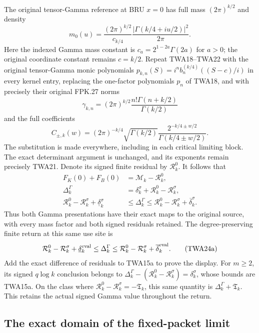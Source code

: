 The original tensor-Gamma reference at BRU $x=0$ has full mass
$(2\pi)^{k/2}$ and density
\[
m_0(u)=\frac{(2\pi)^{k/2}}{c_{k/4}}
                   \frac{|\Gamma(k/4+iu/2)|^2}{2\pi}.
\]
Here the indexed Gamma mass constant is
$c_a=2^{1-2a}\Gamma(2a)$ for $a>0$; the original coordinate
constant remains $c=k/2$.
Repeat TWA18--TWA22 with the original tensor-Gamma monic polynomials
$p_{k,n}(S)=i^n b_n^{(k/4)}((S-c)/i)$ in every kernel entry,
replacing the one-factor polynomials $p_n$ of TWA18, and with
precisely their original FPK.27 norms
\[
\gamma_{k,n}=(2\pi)^{k/2}
                   \frac{n!\Gamma(n+k/2)}{\Gamma(k/2)}
\]
and the full coefficients
\[
C_{\pm,k}(w)=(2\pi)^{-k/4}\sqrt{\Gamma(k/2)}
              \frac{2^{-k/4\pm w/2}}{\Gamma(k/4\pm w/2)}.
\]
The substitution is made everywhere, including in each critical
limiting block. The exact determinant argument is unchanged, and
its exponents remain precisely TWA21. Denote its signed finite
residual by $\mathcal R_k^0$. It follows that
\[
\boxed{\begin{aligned}
F_K(0)+F_B(0)&=\mathcal M_k-\mathcal R_k^0,\\
\Delta_k^\Gamma
&=\delta_k^\sigma+\mathcal R_k^0-\mathcal R_k^\sigma,\\
\mathcal R_k^0-\mathcal R_k^\sigma+\underline\delta_k^\sigma
&\leq\Delta_k^\Gamma
\leq\mathcal R_k^0-\mathcal R_k^\sigma+\overline\delta_k^\sigma.
\end{aligned}}\tag{TWA24}
\]
Thus both Gamma presentations have their exact maps to the original
source, with every mass factor and both signed residuals retained.
The degree-preserving finite return at this same use site is
\[
 \mathcal R_k^0-\mathcal R_k^\sigma+\underline\delta_k^{\rm eval}
 \leq\Delta_k^\Gamma
 \leq\mathcal R_k^0-\mathcal R_k^\sigma+\overline\delta_k^{\rm eval}.
 \tag{TWA24a}
\]
Add the exact difference of residuals to TWA15a to prove the
display. For $m\geq2$, its signed $q\log k$ conclusion belongs
to $\Delta_k^\Gamma-(\mathcal R_k^0-\mathcal R_k^\sigma)
=\delta_k^\sigma$, whose bounds are TWA15a. On the class where
$\mathcal R_k^0-\mathcal R_k^\sigma=-\mathfrak T_k$, this same
quantity is $\Delta_k^\Gamma+\mathfrak T_k$. This retains the
actual signed Gamma value throughout the return.

\subsection{The exact domain of the fixed-packet limit}

